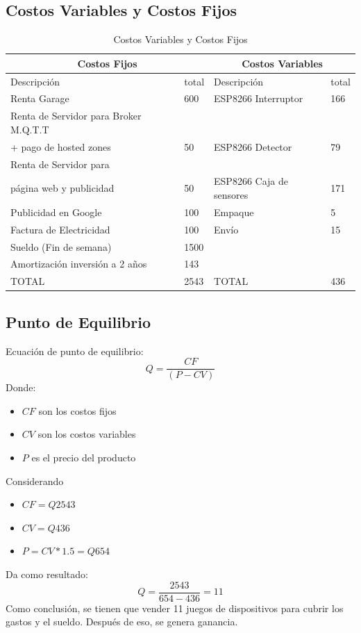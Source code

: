 \documentclass[oneside]{article}
\begin{document}
\subsection*{Costos Variables y Costos Fijos}
\begin{table}[H]
\centering

\begin{longtable}[c]{llll}
\toprule
\multicolumn{2}{c}{Costos Fijos} & \multicolumn{2}{c}{Costos Variables} \\
\midrule
Descripción & total & Descripción & total \\
\hline 
Renta Garage & 600 & ESP8266 Interruptor &  166 \\
Renta de Servidor para Broker M.Q.T.T \\+ pago de hosted zones & 50 & ESP8266 Detector & 79  \\
Renta de Servidor para \\ página web y publicidad & 50 & ESP8266 Caja de sensores & 171 \\
Publicidad en Google & 100 & Empaque & 5 \\
Factura de Electricidad & 100 & Envío & 15 \\
Sueldo (Fin de semana) & 1500 & &\\
Amortización inversión a 2 años & 143 & & \\
\hline
TOTAL & 2543 &  TOTAL & 436 \\
\hline
\end{longtable}
\caption*{Costos Variables y Costos Fijos}
\end{table}

\subsection*{Punto de Equilibrio}
Ecuación de punto de equilibrio:
$$Q = \frac{CF}{(P-CV)}$$
Donde:
\begin{itemize}
\item $CF$ son los costos fijos
\item $CV$ son los costos variables
\item $P$ es el precio del producto 
\end{itemize}
Considerando
\begin{itemize}
\item $CF = Q2543$
\item $CV = Q436$
\item $P = CV * 1.5 = Q654$
\end{itemize}
Da como resultado:
$$Q = \frac{2543}{654-436}=11$$
Como conclusión, se tienen que vender 11 juegos de dispositivos para cubrir los gastos y el sueldo. Después de eso, se genera ganancia.
\end{document}
